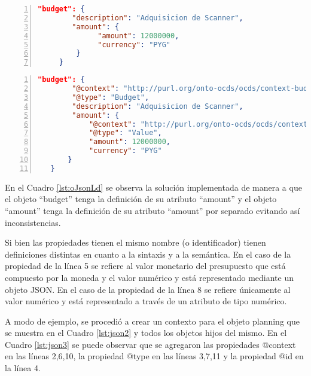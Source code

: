 \noindent\begin{minipage}{\textwidth}
\begin{lstlisting}[captionpos=b, caption=Objeto JSON con colisión semántica entre conceptos, label=lst:oJson,language=json,firstnumber=1,  numbers=left,  numberstyle=\tiny\color{mygray},frame=single]
    "budget": {
        "description": "Adquisicion de Scanner",
        "amount": {
              "amount": 12000000,
              "currency": "PYG"
         }
     }  
    \end{lstlisting}
\end{minipage}
\noindent
\begin{minipage}{\textwidth}
    \begin{lstlisting}[captionpos=b, caption=Objeto JSON-LD. Sin colisión semántica entre conceptos , label=lst:oJsonLd, language=json,firstnumber=1,  numbers=left,  numberstyle=\tiny\color{mygray},frame=single]
    "budget": {
        "@context": "http://purl.org/onto-ocds/ocds/context-budget.json",
        "@type": "Budget",
        "description": "Adquisicion de Scanner",
        "amount": {
            "@context": "http://purl.org/onto-ocds/ocds/context-value.json",
            "@type": "Value",
            "amount": 12000000,
            "currency": "PYG"
       }
   }   
        \end{lstlisting}
    \end{minipage}

En el Cuadro \ref{lst:oJsonLd} se observa la solución implementada de manera a que el objeto “budget” tenga la definición de su atributo “amount” y el objeto “amount” tenga la definición de su atributo “amount” por separado evitando así inconsistencias.

Si bien las propiedades tienen el mismo nombre (o identificador) tienen definiciones distintas en cuanto a la sintaxis y a la semántica. En el caso de la propiedad de la línea 5 se refiere al valor monetario del presupuesto que está compuesto por la moneda y el valor numérico y está representado mediante un objeto JSON. En el caso de la propiedad de la línea 8 se refiere únicamente al valor numérico y está representado a través de un atributo de tipo numérico. 


A modo de ejemplo, se procedió a crear un contexto para el objeto planning que se muestra en el Cuadro \ref{lst:json2} y todos los objetos hijos del mismo. En el Cuadro \ref{lst:json3} se puede observar que se agregaron las propiedades @context en las líneas 2,6,10, la propiedad @type en las líneas 3,7,11 y la propiedad @id en la línea 4.

